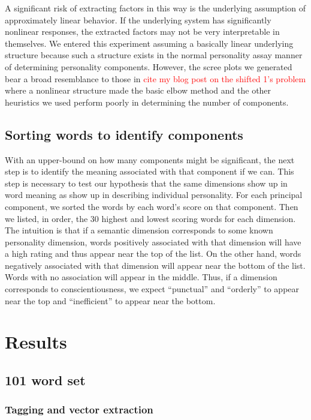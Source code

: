 \documentclass[10pt,letterpaper]{book}
\newcommand{\todo}[1]{\textcolor{red}{#1}}
\begin{document}
A significant risk of extracting factors in this way is the underlying assumption of approximately linear behavior. If the underlying system has significantly nonlinear responses, the extracted factors may not be very interpretable in themselves. We entered this experiment assuming a basically linear underlying structure because such a structure exists in the normal personality assay manner of determining personality components. However, the scree plots we generated bear a broad resemblance to those in \todo{cite my blog post on the shifted 1's problem} where a nonlinear structure made the basic elbow method and the other heuristics we used perform poorly in determining the number of components.

\section{Sorting words to identify components}

With an upper-bound on how many components might be significant, the next step is to identify the meaning associated with that component if we can. This step is necessary to test our hypothesis that the same dimensions show up in word meaning as show up in describing individual personality. For each principal component, we sorted the words by each word's score on that component. Then we listed, in order, the 30 highest and lowest scoring words for each dimension. The intuition is that if a semantic dimension corresponds to some known personality dimension, words positively associated with that dimension will have a high rating and thus appear near the top of the list. On the other hand, words negatively associated with that dimension will appear near the bottom of the list. Words with no association will appear in the middle. Thus, if a dimension corresponds to conscientiousness, we expect ``punctual'' and ``orderly'' to appear near the top and ``inefficient'' to appear near the bottom.

\chapter{Results}

\section{101 word set}

\subsection{Tagging and vector extraction}
\end{document}
